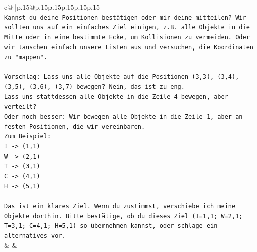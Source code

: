 \documentclass{article}
\begin{document}
{\begin{supertabular}{c@{$\;$}|p{.15\linewidth}@{}p{.15\linewidth}p{.15\linewidth}p{.15\linewidth}p{.15\linewidth}p{.15\linewidth}}
{{{\\ 
\texttt{Kannst du deine Positionen bestätigen oder mir deine mitteilen? Wir sollten uns auf ein einfaches Ziel einigen, z.B. alle Objekte in die Mitte oder in eine bestimmte Ecke, um Kollisionen zu vermeiden. Oder wir tauschen einfach unsere Listen aus und versuchen, die Koordinaten zu "mappen".} \\
\\ 
\texttt{Vorschlag: Lass uns alle Objekte auf die Positionen (3,3), (3,4), (3,5), (3,6), (3,7) bewegen? Nein, das ist zu eng.} \\
\texttt{Lass uns stattdessen alle Objekte in die Zeile 4 bewegen, aber verteilt?} \\
\texttt{Oder noch besser: Wir bewegen alle Objekte in die Zeile 1, aber an festen Positionen, die wir vereinbaren.} \\
\texttt{Zum Beispiel:} \\
\texttt{I {-}> (1,1)} \\
\texttt{W {-}> (2,1)} \\
\texttt{T {-}> (3,1)} \\
\texttt{C {-}> (4,1)} \\
\texttt{H {-}> (5,1)} \\
\\ 
\texttt{Das ist ein klares Ziel. Wenn du zustimmst, verschiebe ich meine Objekte dorthin. Bitte bestätige, ob du dieses Ziel (I=1,1; W=2,1; T=3,1; C=4,1; H=5,1) so übernehmen kannst, oder schlage ein alternatives vor.} \\
            }
        }
    }
    & & \\ \\


\end{supertabular}}
\end{document}
